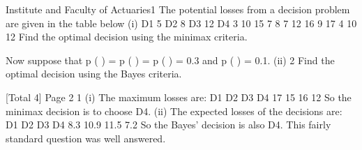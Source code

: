 \documentclass[a4paper,12pt]{article}
\begin{document}
 Institute and Faculty of Actuaries1
The potential losses from a decision problem are given in the table below
(i)
 D1
5 D2
8 D3
12 D4
3
 10 15 7 8
 7 12 16 9
 17 4 10 12
Find the optimal decision using the minimax criteria.

Now suppose that p (  ) = p (  ) = p (  ) = 0.3 and p (  ) = 0.1.
(ii)
2
Find the optimal decision using the Bayes criteria.

[Total 4]
Page 2%
1
(i)
The maximum losses are:
D1
D2
D3
D4
17
15
16
12
So the minimax decision is to choose D4.
(ii)
The expected losses of the decisions are:
D1
D2
D3
D4
8.3
10.9
11.5
7.2
So the Bayes’ decision is also D4.
This fairly standard question was well answered.
\end{document}
